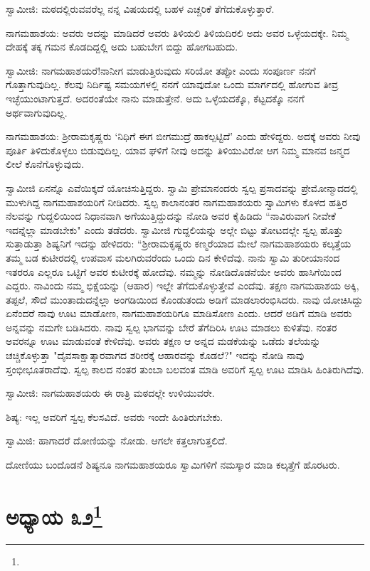 ಸ್ವಾಮೀಜಿ: ಮಠದಲ್ಲಿರುವವರೆಲ್ಲ ನನ್ನ ವಿಷಯದಲ್ಲಿ ಬಹಳ ಎಚ್ಚರಿಕೆ ತೆಗೆದುಕೊಳ್ಳುತ್ತಾರೆ.

ನಾಗಮಹಾಶಯ: ಅವರು ಅದನ್ನು ಮಾಡಿದರೆ ಅವರು ತಿಳಿಯಲಿ ತಿಳಿಯದಿರಲಿ ಅದು ಅವರ ಒಳ್ಳೆಯದಕ್ಕೇ. ನಿಮ್ಮ ದೇಹಕ್ಕೆ ತಕ್ಕ ಗಮನ ಕೊಡದಿದ್ದಲ್ಲಿ ಅದು ಬಹುಬೇಗ ಬಿದ್ದು ಹೋಗಬಹುದು.

ಸ್ವಾಮೀಜಿ: ನಾಗಮಹಾಶಯರೆ!ನಾನೀಗ ಮಾಡುತ್ತಿರುವುದು ಸರಿಯೋ ತಪ್ಪೋ ಎಂದು ಸಂಪೂರ್ಣ ನನಗೆ ಗೊತ್ತಾಗುವುದಿಲ್ಲ. ಕೆಲವು ನಿರ್ದಿಷ್ಟ ಸಮಯಗಳಲ್ಲಿ ನನಗೆ ಯಾವುದೋ ಒಂದು ಮಾರ್ಗದಲ್ಲಿ ಹೋಗುವ ತೀವ್ರ ಇಚ್ಛೆಯುಂಟಾಗುತ್ತದೆ. ಅದರಂತೆಯೇ ನಾನು ಮಾಡುತ್ತೇನೆ. ಅದು ಒಳ್ಳೆಯದಕ್ಕೊ, ಕೆಟ್ಟದಕ್ಕೊ ನನಗೆ ಅರ್ಥವಾಗುವುದಿಲ್ಲ.

ನಾಗಮಹಾಶಯ: ಶ‍್ರೀರಾಮಕೃಷ್ಣರು ‘ನಿಧಿಗೆ ಈಗ ಬೀಗಮುದ್ರೆ ಹಾಕಲ್ಪಟ್ಟಿದೆ’ ಎಂದು ಹೇಳಿದ್ದರು. ಅದಕ್ಕೆ ಅವರು ನೀವು ಪೂರ್ತಿ ತಿಳಿದುಕೊಳ್ಳಲು ಬಿಡುವುದಿಲ್ಲ. ಯಾವ ಘಳಿಗೆ ನೀವು ಅದನ್ನು ತಿಳಿಯುವಿರೋ ಆಗ ನಿಮ್ಮ ಮಾನವ ಜನ್ಮದ ಲೀಲೆ ಕೊನೆಗೊಳ್ಳುವುದು.

ಸ್ವಾಮೀಜಿ ಏನನ್ನೊ ಎವೆಯಿಕ್ಕದೆ ಯೋಚಿಸುತ್ತಿದ್ದರು. ಸ್ವಾಮಿ ಪ್ರೇಮಾನಂದರು ಸ್ವಲ್ಪ ಪ್ರಸಾದವನ್ನು ಪ್ರೇಮೋನ್ಮಾದದಲ್ಲಿ ಮುಳುಗಿದ್ದ ನಾಗಮಹಾಶಯರಿಗೆ ನೀಡಿದರು. ಸ್ವಲ್ಪ ಕಾಲಾನಂತರ ನಾಗಮಹಾಶಯರು ಸ್ವಾಮಿಗಳು ಕೊಳದ ಹತ್ತಿರ ನೆಲವನ್ನು ಗುದ್ದಲಿಯಿಂದ ನಿಧಾನವಾಗಿ ಅಗೆಯುತ್ತಿದ್ದುದನ್ನು ನೋಡಿ ಅವರ ಕೈಹಿಡಿದು “ನಾವಿರುವಾಗ ನೀವೇಕೆ ಇದನ್ನೆಲ್ಲಾ ಮಾಡಬೇಕು" ಎಂದು ತಡೆದರು. ಸ್ವಾಮೀಜಿ ಗುದ್ದಲಿಯನ್ನು ಅಲ್ಲೇ ಬಿಟ್ಟು ತೋಟದಲ್ಲೇ ಸ್ವಲ್ಪ ಹೊತ್ತು ಸುತ್ತಾಡುತ್ತಾ ಶಿಷ್ಯನಿಗೆ ಇದನ್ನು ಹೇಳಿದರು: “ಶ‍್ರೀರಾಮಕೃಷ್ಣರು ಕಣ್ಮರೆಯಾದ ಮೇಲೆ ನಾಗಮಹಾಶಯರು ಕಲ್ಕತ್ತೆಯ ತಮ್ಮ ಬಡ ಕುಟೀರದಲ್ಲಿ ಉಪವಾಸ ಮಲಗಿರುವರೆಂದು ಒಂದು ದಿನ ಕೇಳಿದೆವು. ನಾನು ಸ್ವಾಮಿ ತುರೀಯಾನಂದ ಇತರರೂ ಎಲ್ಲರೂ ಒಟ್ಟಿಗೆ ಅವರ ಕುಟೀರಕ್ಕೆ ಹೋದೆವು. ನಮ್ಮನ್ನು ನೋಡಿದೊಡನೆಯೇ ಅವರು ಹಾಸಿಗೆಯಿಂದ ಎದ್ದರು. ನಾವಿಂದು ನಮ್ಮ ಭಿಕ್ಷೆಯನ್ನು (ಆಹಾರ) ಇಲ್ಲೇ ತೆಗೆದುಕೊಳ್ಳುತ್ತೇವೆ ಎಂದೆವು. ತಕ್ಷಣ ನಾಗಮಹಾಶಯ ಅಕ್ಕಿ, ತಪ್ಪಲೆ, ಸೌದೆ ಮುಂತಾದುದನ್ನೆಲ್ಲಾ ಅಂಗಡಿಯಿಂದ ಕೊಂಡುತಂದು ಅಡಿಗೆ ಮಾಡಲಾರಂಭಿಸಿದರು. ನಾವು ಯೋಚಿಸಿದ್ದು ಏನೆಂದರೆ ನಾವು ಊಟ ಮಾಡೋಣ, ನಾಗಮಹಾಶಯರಿಗೂ ಮಾಡಿಸೋಣ ಎಂದು. ಆದರೆ ಅಡಿಗೆ ಮಾಡಿ ಅವರು ಅನ್ನವನ್ನು ನಮಗೇ ಬಡಿಸಿದರು. ನಾವು ಸ್ವಲ್ಪ ಭಾಗವನ್ನು ಬೇರೆ ತೆಗೆದಿರಿಸಿ ಊಟ ಮಾಡಲು ಕುಳಿತೆವು. ನಂತರ ಅವರನ್ನೂ ಊಟ ಮಾಡುವಂತೆ ಕೇಳಿದೆವು. ಅವರು ತಕ್ಷಣ ಆ ಅನ್ನದ ಮಡಕೆಯನ್ನು ಒಡೆದು ತಲೆಯನ್ನು ಚಚ್ಚಿಕೊಳ್ಳುತ್ತಾ "ದೈವಸಾಕ್ಷಾತ್ಕಾರವಾಗದ ಶರೀರಕ್ಕೆ ಆಹಾರವನ್ನು ಕೊಡಲೆ?" ಇದನ್ನು ನೋಡಿ ನಾವು ಸ್ತಂಭೀಭೂತರಾದೆವು. ಸ್ವಲ್ಪ ಕಾಲದ ನಂತರ ತುಂಬಾ ಬಲವಂತ ಮಾಡಿ ಅವರಿಗೆ ಸ್ವಲ್ಪ ಊಟ ಮಾಡಿಸಿ ಹಿಂತಿರುಗಿದೆವು.

ಸ್ವಾಮೀಜಿ: ನಾಗಮಹಾಶಯರು ಈ ರಾತ್ರಿ ಮಠದಲ್ಲೇ ಉಳಿಯುವರೇ.

ಶಿಷ್ಯ: ಇಲ್ಲ ಅವರಿಗೆ ಸ್ವಲ್ಪ ಕೆಲಸವಿದೆ. ಅವರು ಇಂದೇ ಹಿಂತಿರುಗಬೇಕು.

ಸ್ವಾಮಿಜಿ: ಹಾಗಾದರೆ ದೋಣಿಯನ್ನು ನೋಡು. ಆಗಲೇ ಕತ್ತಲಾಗುತ್ತಲಿದೆ.

ದೋಣಿಯು ಬಂದೊಡನೆ ಶಿಷ್ಯನೂ ನಾಗಮಹಾಶಯರೂ ಸ್ವಾಮಿಗಳಿಗೆ ನಮಸ್ಕಾರ ಮಾಡಿ ಕಲ್ಕತ್ತೆಗೆ ಹೊರಟರು.

\newpage

\chapter[ಅಧ್ಯಾಯ ೩೨]{ಅಧ್ಯಾಯ ೩೨\protect\footnote{}}

